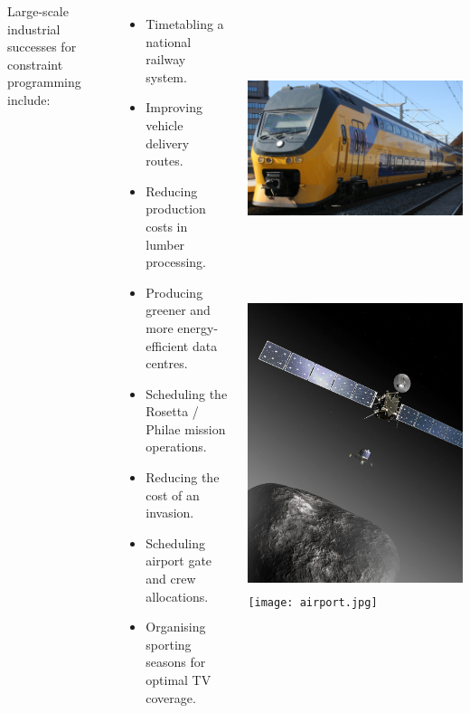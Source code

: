 \documentclass[a0paper]{tikzposter}
\begin{document}
\begin{columns}
{Large-scale industrial successes for constraint programming include:
\begin{itemize}
    \item Timetabling a national railway system.
    \item Improving vehicle delivery routes.
    \item Reducing production costs in lumber processing.
    \item Producing greener and more energy-efficient data centres.
    \item Scheduling the Rosetta / Philae mission operations.
    \item Reducing the cost of an invasion.
    \item Scheduling airport gate and crew allocations.
    \item Organising sporting seasons for optimal TV coverage.
\end{itemize}

\vspace{1em}

\begin{center}
    \includegraphics*[keepaspectratio=true,height=8.5cm]{train.jpg}
    \hfill
    \includegraphics*[keepaspectratio=true,height=8.5cm]{comet.jpg}
    \hfill
    \texttt{[image: airport.jpg]}
\end{center}

}
\end{columns}
\end{document}
